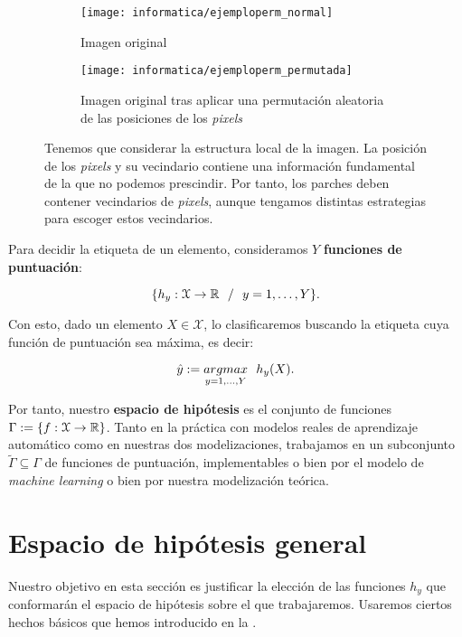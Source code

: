 \begin{figure}[!hbtp]
	\centering
	\ajustarsubcaptions
	\begin{subfigure}[t]{0.45\textwidth}
		\centering
		\texttt{[image: informatica/ejemploperm\_normal]}
		\caption{Imagen original}
	\end{subfigure}
	\begin{subfigure}[t]{0.45\textwidth}
		\centering
		\texttt{[image: informatica/ejemploperm\_permutada]}
		\caption{Imagen original tras aplicar una permutación aleatoria de las posiciones de los \textit{pixels}}
	\end{subfigure}
	\caption{Tenemos que considerar la estructura local de la imagen. La posición de los \textit{pixels} y su vecindario contiene una información fundamental de la que no podemos prescindir. Por tanto, los parches deben contener vecindarios de \textit{pixels}, aunque tengamos distintas estrategias para escoger estos vecindarios.}
	\label{img:desordenar_pixeles_repetida_mates}
\end{figure}

Para decidir la etiqueta de un elemento, consideramos $Y$ \textbf{funciones de puntuación}:

\begin{equation}
	\{ h_y: \mathcal{X} \to \mathbb{R} \ \  / \ \  y = 1, \ldots, Y \}.
\end{equation}

Con esto, dado un elemento $X \in \mathcal{X}$, lo clasificaremos buscando la etiqueta cuya función de puntuación sea máxima, es decir:

$$\hat{y} := \underset{y = 1, \ldots, Y}{argmax} \ \  h_y(X).$$

Por tanto, nuestro \textbf{espacio de hipótesis} es el conjunto de funciones $\Gamma := \{ f: \mathcal{X} \to \mathbb{R} \}$. Tanto en la práctica con modelos reales de aprendizaje automático como en nuestras dos modelizaciones, trabajamos en un subconjunto $\tilde{\Gamma} \subseteq \Gamma$ de funciones de puntuación, implementables o bien por el modelo de \textit{machine learning} o bien por nuestra modelización teórica.

\section{Espacio de hipótesis general} \label{sec:espacio_hipotesis_general}

Nuestro objetivo en esta sección es justificar la elección de las funciones $h_y$ que conformarán el espacio de hipótesis sobre el que trabajaremos. Usaremos ciertos hechos básicos que hemos introducido en la .

